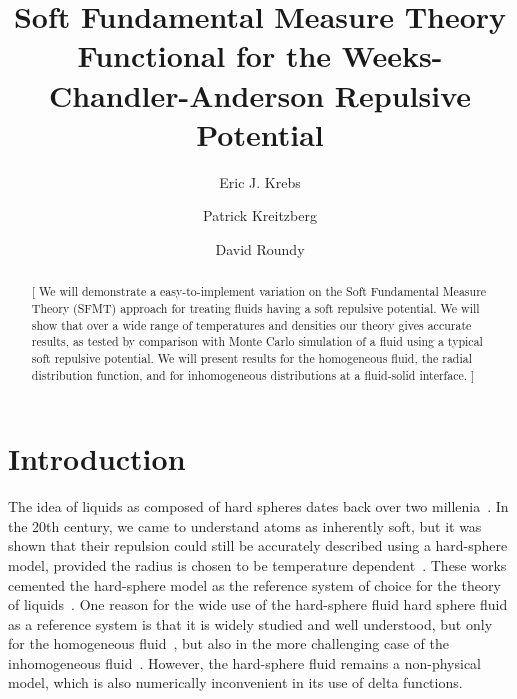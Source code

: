\documentclass[letterpaper,twocolumn,amsmath,amssymb,prb]{revtex4-1}
\newcommand{\red}[1]{{\color{red} #1}}
\newcommand{\fixme}[1]{\red{[#1]}}
\begin{document}
\title{Soft Fundamental Measure Theory Functional for the
  Weeks-Chandler-Anderson Repulsive Potential}

\author{Eric J. Krebs}

\author{Patrick Kreitzberg}

\author{David Roundy}

\begin{abstract}
\fixme{ We will demonstrate a easy-to-implement variation on the Soft
  Fundamental Measure Theory (SFMT) approach for treating fluids
  having a soft repulsive potential.  We will show that over a wide
  range of temperatures and densities our theory gives accurate
  results, as tested by comparison with Monte Carlo simulation of a
  fluid using a typical soft repulsive potential.  We will present
  results for the homogeneous fluid, the radial distribution function,
  and for inhomogeneous distributions at a fluid-solid interface. }
\end{abstract}

\maketitle

\section{Introduction}

The idea of liquids as composed of hard spheres dates back over two
millenia~\cite{lucretius}.  In the 20th century, we came to understand
atoms as inherently soft, but it was shown that their repulsion could
still be accurately described using a hard-sphere model, provided the
radius is chosen to be temperature
dependent~\cite{rowlinson1964statistical, barker1967perturbation,
  andersen1971relationship}.  These works cemented the hard-sphere
model as the reference system of choice for the theory of
liquids~\cite{gil-villegas-1997-SAFT-VR, clark2006developing,
  lafitte2013accurate}.  One reason for the wide use of the
hard-sphere fluid hard sphere fluid as a reference system is that it
is widely studied and well understood, but only for the homogeneous
fluid~\cite{carnahan1969equation}, but also in the more challenging
case of the inhomogeneous fluid~\cite{rosenfeld1989, rosenfeld1997,
  roth2002whitebear}.  However, the hard-sphere fluid remains a
non-physical model, which is also numerically inconvenient in its use
of delta functions.
\end{document}
